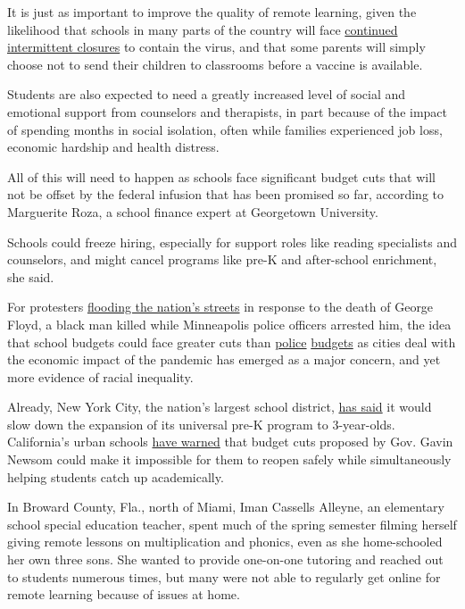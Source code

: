 It is just as important to improve the quality of remote learning, given
the likelihood that schools in many parts of the country will face
\href{https://www.nytimes.com/2020/04/28/us/coronavirus-schools-reopen.html}{continued
intermittent closures} to contain the virus, and that some parents will
simply choose not to send their children to classrooms before a vaccine
is available.

Students are also expected to need a greatly increased level of social
and emotional support from counselors and therapists, in part because of
the impact of spending months in social isolation, often while families
experienced job loss, economic hardship and health distress.

All of this will need to happen as schools face significant budget cuts
that will not be offset by the federal infusion that has been promised
so far, according to Marguerite Roza, a school finance expert at
Georgetown University.

Schools could freeze hiring, especially for support roles like reading
specialists and counselors, and might cancel programs like pre-K and
after-school enrichment, she said.

For protesters
\href{https://www.nytimes.com/2020/06/03/us/live-george-floyd-protests-today.html}{flooding
the nation's streets} in response to the death of George Floyd, a black
man killed while Minneapolis police officers arrested him, the idea that
school budgets could face greater cuts than
\href{https://www.inquirer.com/news/philadelphia/philadelphia-police-funding-increase-george-floyd-protests-20200602.html}{police}
\href{https://gothamist.com/news/nypd-defends-its-massive-budget-social-services-and-youth-programs-are-cut}{budgets}
as cities deal with the economic impact of the pandemic has emerged as a
major concern, and yet more evidence of racial inequality.

Already, New York City, the nation's largest school district,
\href{https://www.amny.com/education-2/carranza-warns-of-massive-nyc-public-school-cuts-in-face-of-horrific-budget/}{has
said} it would slow down the expansion of its universal pre-K program to
3-year-olds. California's urban schools
\href{https://www.documentcloud.org/documents/6894024-2020-21StateBud-Urban-Let051820.html}{have
warned} that budget cuts proposed by Gov. Gavin Newsom could make it
impossible for them to reopen safely while simultaneously helping
students catch up academically.

In Broward County, Fla., north of Miami, Iman Cassells Alleyne, an
elementary school special education teacher, spent much of the spring
semester filming herself giving remote lessons on multiplication and
phonics, even as she home-schooled her own three sons. She wanted to
provide one-on-one tutoring and reached out to students numerous times,
but many were not able to regularly get online for remote learning
because of issues at home.

